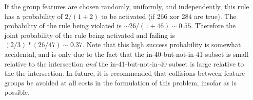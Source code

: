 \documentclass[aps,prl,twocolumn,superscriptaddress,groupedaddress]{revtex4}  %
\begin{document}
If the group features are chosen randomly, uniformly, and independently, this
rule has a probability of $2/(1+2)$ to be activated (if 266 xor 284 are true).
The probability of the rule being violated is $\sim 26/(1+46) \sim 0.55$.
Therefore the joint probability of the rule being activated and failing is
$(2/3) * (26/47) \sim 0.37$. Note that this high success probability is somewhat
accidental, and is only due to the fact that the in-40-but-not-in-41 subset is
small relative to the intersection \emph{and} the in-41-but-not-in-40 subset is
large relative to the the intersection. In future, it is recommended that
collisions between feature groups be avoided at all costs in the formulation of
this problem, insofar as is possible.


% 
% 
\end{document}
